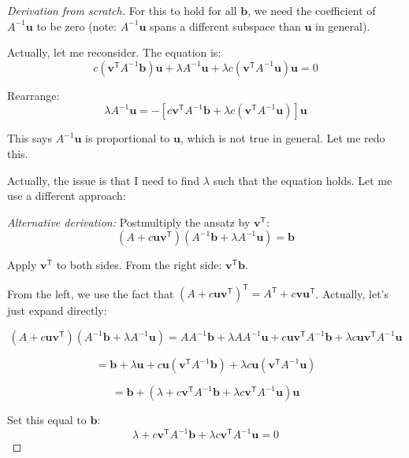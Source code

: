 \documentclass[11pt,a4paper]{article}
\theoremstyle{plain}
\theoremstyle{definition}
\newcommand{\vct}[1]{\mathbf{#1}}
\newcommand{\tr}{\mathsf{T}}
\begin{document}
\begin{proof}[Derivation from scratch]
For this to hold for all $\vct{b}$, we need the coefficient of $A^{-1}\vct{u}$ to be zero (note: $A^{-1}\vct{u}$ spans a different subspace than $\vct{u}$ in general).

Actually, let me reconsider. The equation is:
\begin{equation}
c(\vct{v}^\tr A^{-1}\vct{b})\vct{u} + \lambda A^{-1}\vct{u} + \lambda c(\vct{v}^\tr A^{-1}\vct{u})\vct{u} = 0
\end{equation}

Rearrange:
\begin{equation}
\lambda A^{-1}\vct{u} = -[c\vct{v}^\tr A^{-1}\vct{b} + \lambda c(\vct{v}^\tr A^{-1}\vct{u})]\vct{u}
\end{equation}

This says $A^{-1}\vct{u}$ is proportional to $\vct{u}$, which is not true in general. Let me redo this.

Actually, the issue is that I need to find $\lambda$ such that the equation holds. Let me use a different approach:

\textit{Alternative derivation:} Postmultiply the ansatz by $\vct{v}^\tr$:
\begin{equation}
(A + c \vct{u} \vct{v}^\tr)(A^{-1}\vct{b} + \lambda A^{-1}\vct{u}) = \vct{b}
\end{equation}

Apply $\vct{v}^\tr$ to both sides. From the right side: $\vct{v}^\tr \vct{b}$.

From the left, we use the fact that $(A + c\vct{u}\vct{v}^\tr)^\tr = A^\tr + c\vct{v}\vct{u}^\tr$. Actually, let's just expand directly:

\begin{equation}
(A + c\vct{u}\vct{v}^\tr)(A^{-1}\vct{b} + \lambda A^{-1}\vct{u})
= AA^{-1}\vct{b} + \lambda AA^{-1}\vct{u} + c\vct{u}\vct{v}^\tr A^{-1}\vct{b} + \lambda c\vct{u}\vct{v}^\tr A^{-1}\vct{u}
\end{equation}

\begin{equation}
= \vct{b} + \lambda\vct{u} + c\vct{u}(\vct{v}^\tr A^{-1}\vct{b}) + \lambda c\vct{u}(\vct{v}^\tr A^{-1}\vct{u})
\end{equation}

\begin{equation}
= \vct{b} + (\lambda + c\vct{v}^\tr A^{-1}\vct{b} + \lambda c\vct{v}^\tr A^{-1}\vct{u})\vct{u}
\end{equation}

Set this equal to $\vct{b}$:
\begin{equation}
\lambda + c\vct{v}^\tr A^{-1}\vct{b} + \lambda c\vct{v}^\tr A^{-1}\vct{u} = 0
\end{equation}


\end{proof}
\end{document}
